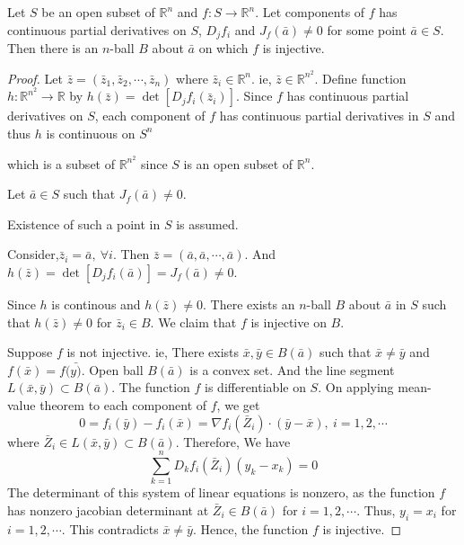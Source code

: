 \begin{theorem}
Let $S$ be an open subset of $\mathbb{R}^n$ and $f : S \to \mathbb{R}^n$.
Let components of $f$ has continuous partial derivatives on $S$, $D_jf_i$ and $J_f(\bar{a}) \ne 0$ for some point $\bar{a} \in S$.
Then there is an $n$-ball $B$ about $\bar{a}$ on which $f$ is injective.
\end{theorem}
\begin{proof}
	Let $\bar{z} = (\bar{z}_1,\bar{z}_2,\cdots,\bar{z}_n)$ where $\bar{z}_i \in \mathbb{R}^n$.
	ie, $\bar{z} \in \mathbb{R}^{n^2}$.
	Define function $h : \mathbb{R}^{n^2} \to \mathbb{R}$ by $h(\bar{z}) = \det{[D_jf_i(\bar{z}_i)]}$.
	Since $f$ has continuous partial derivatives on $S$, each component of $f$ has continuous partial derivatives in $S$ and thus $h$ is continuous on $S^n$ 
\begin{commentary} 
	which is a subset of $\mathbb{R}^{n^2}$ since $S$ is an open subset of $\mathbb{R}^n$.
\end{commentary}

	Let $\bar{a} \in S$ such that $J_f(\bar{a}) \ne 0$.
\begin{commentary}
	Existence of such a point in $S$ is assumed.
\end{commentary}
	Consider,$\bar{z}_i = \bar{a},\ \forall i$.
	Then $\bar{z} = (\bar{a},\bar{a},\cdots,\bar{a})$.
	And $h(\bar{z}) = \det{[D_jf_i(\bar{a})]} = J_f(\bar{a}) \ne 0$.

	Since $h$ is continous and $h(\bar{z}) \ne 0$.
	There exists an $n$-ball $B$ about $\bar{a}$ in $S$ such that $h(\bar{z}) \ne 0$ for $\bar{z}_i \in B$.
	We claim that $f$ is injective on $B$.

	Suppose $f$ is not injective.
	ie, There exists $\bar{x},\bar{y} \in B(\bar{a})$ such that $\bar{x} \ne \bar{y}$ and $f(\bar{x}) = f(\bar{y)}$.
	Open ball $B(\bar{a})$ is a convex set.
	And the line segment $L(\bar{x},\bar{y}) \subset B(\bar{a})$.
	The function $f$ is differentiable on $S$.
	On applying mean-value theorem to each component of $f$, we get
	\[ 0 = f_i(\bar{y})-f_i(\bar{x}) = \nabla f_i(\bar{Z}_i)\cdot(\bar{y}-\bar{x}),\ i=1,2,\cdots \]
	where $\bar{Z}_i \in L(\bar{x},\bar{y}) \subset B(\bar{a})$.
	Therefore, We have
	\[ \sum_{k=1}^n D_kf_i(\bar{Z}_i)(y_k-x_k) = 0 \]
	The determinant of this system of linear equations is nonzero, as the function $f$ has nonzero jacobian determinant at $\bar{Z}_i \in B(\bar{a})$ for $i = 1,2,\cdots$.
	Thus, $y_i = x_i$ for $i = 1,2,\cdots$. This contradicts $\bar{x} \ne \bar{y}$.
	Hence, the function $f$ is injective.
\end{proof}

